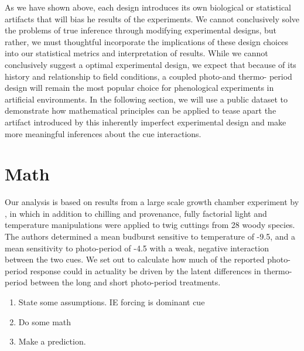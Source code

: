 \documentclass[12pt]{article}\usepackage[]{graphicx}\usepackage[]{color}
\begin{document}
\indent As we have shown above, each design introduces its own biological or statistical artifacts that will bias he results of the experiments. We cannot conclusively solve the problems of true inference through modifying experimental designs, but rather, we must thoughtful incorporate the implications of these design choices into our statistical metrics and interpretation of results. While we cannot conclusively suggest a optimal experimental design, we expect that because of its history and relationship to field conditions, a coupled photo-and thermo- period design will remain the most popular choice for phenological experiments in artificial environments. In the following section, we will use a public dataset to demonstrate how mathematical principles can be applied to tease apart the artifact introduced by this inherently imperfect experimental design and make more meaningful inferences about the cue interactions. 


\section*{Math}   
\indent\indent  Our analysis is based on results from a large scale growth chamber experiment by \citet{Flynn2018}, in which in addition to chilling and provenance, fully factorial light and temperature manipulations were applied to twig cuttings from 28 woody species. The authors determined a mean budburst  sensitive to temperature of -9.5, and  a mean sensitivity to photo-period of -4.5 with a weak, negative interaction between the two cues. We set out to calculate how much of the reported photo-period response could in actuality be driven by the latent differences in thermo-period between the long and short photo-period treatments. 
    \begin{enumerate}

    \item  State some assumptions. IE forcing is dominant cue
        \item Do some math
        \item  Make a prediction.
    \end{enumerate}
\end{document}
